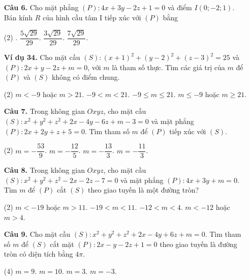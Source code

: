 \documentclass[12pt, a4paper]{article}
\begin{document}
\begin{enumerate}[label=\textbf{\arabic*.}, wide=0pt, leftmargin=*]
    \item[\textbf{Câu 6.}] Cho mặt phẳng \((P): 4x+3y-2z+1=0\) và điểm \(I(0;-2;1)\). Bán kính \(R\) của hình cầu tâm I tiếp xúc với \((P)\) bằng
    \begin{tasks}(2)
        .
        \task \(\dfrac{5\sqrt{29}}{29}\).
        \task \(\dfrac{3\sqrt{29}}{29}\).
        \task \(\dfrac{7\sqrt{29}}{29}\).
    \end{tasks}
    
    \item[\textbf{Ví dụ 34.}] Cho mặt cầu \((S): (x+1)^2+(y-2)^2+(z-3)^2=25\) và \((P): 2x+y-2z+m=0\), với \(m\) là tham số thực. Tìm các giá trị của \(m\) để \((P)\) và \((S)\) không có điểm chung.
    \begin{tasks}(2)
        \task \(m < -9\) hoặc \(m > 21\).
        \task \(-9 < m < 21\).
        \task \(-9 \le m \le 21\).
        \task \(m \le -9\) hoặc \(m \ge 21\).
    \end{tasks}
    
    
    \item[\textbf{Câu 7.}] Trong không gian \(Oxyz\), cho mặt cầu \((S): x^2+y^2+z^2+2x-4y-6z+m-3=0\) và mặt phẳng \((P): 2x+2y+z+5=0\). Tìm tham số \(m\) để \((P)\) tiếp xúc với \((S)\).
    \begin{tasks}(2)
        \task \(m = -\dfrac{53}{9}\).
        \task \(m = -\dfrac{12}{5}\).
        \task \(m = -\dfrac{13}{3}\).
        \task \(m = -\dfrac{11}{3}\).
    \end{tasks}

    \item[\textbf{Câu 8.}] Trong không gian \(Oxyz\), cho mặt cầu \((S): x^2+y^2+z^2-2x-2z-7=0\) và mặt phẳng \((P): 4x+3y+m=0\). Tìm \(m\) để \((P)\) cắt \((S)\) theo giao tuyến là một đường tròn?
    \begin{tasks}(2)
        \task \(m<-19\) hoặc \(m>11\).
        \task \(-19<m<11\).
        \task \(-12<m<4\).
        \task \(m<-12\) hoặc \(m>4\).
    \end{tasks}
    
    \item[\textbf{Câu 9.}] Cho mặt cầu \((S): x^2+y^2+z^2+2x-4y+6z+m=0\). Tìm tham số \(m\) để \((S)\) cắt mặt \((P): 2x-y-2z+1=0\) theo giao tuyến là đường tròn có diện tích bằng \(4\pi\).
    \begin{tasks}(4)
        \task \(m=9\).
        \task \(m=10\).
        \task \(m=3\).
        \task \(m=-3\).
    \end{tasks}
    

\end{enumerate}
\end{document}
